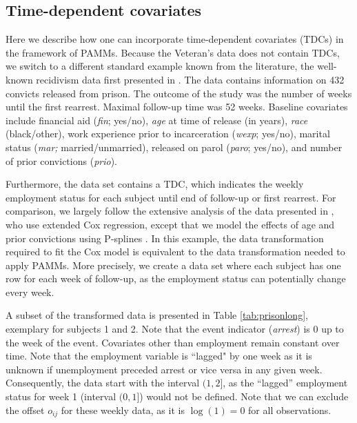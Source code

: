 \documentclass[submit]{smj}
\begin{document}
\subsection{Time-dependent covariates}\label{subsec:tdc}
Here we describe how one can incorporate time-dependent covariates (TDCs) in the framework of PAMMs.
Because the Veteran's data does not contain TDCs, we switch to a different standard example known from the literature, the well-known recidivism data first presented in \cite{Rossi1980}.
The data contains information on 432 convicts released from prison.
The outcome of the study was the number of weeks until the first rearrest.
Maximal follow-up time was 52 weeks. Baseline covariates include
financial aid ({\it fin}; yes/no), {\it age} at time of release (in years),
{\it race} (black/other), work experience prior to incarceration ({\it wexp};
yes/no), marital status ({\it mar;} married/unmarried), released on parol
({\it paro}; yes/no), and number of prior convictions ({\it prio}).

Furthermore, the data set contains a TDC, which indicates the weekly employment
status for each subject until end of follow-up or first rearrest.
For comparison, we largely follow the extensive analysis of the data presented
in \cite{Fox2011}, who use extended Cox regression, except that we model
the effects of age and prior convictions using P-splines \citep{Eilers:98}.
In this example, the data transformation required to fit the Cox model is
equivalent to the data transformation needed to apply PAMMs. More precisely, we create a data set where each subject has one row for each week of follow-up, as the employment status can potentially change every week.

A subset of the transformed data is
presented in Table \ref{tab:prisonlong}, exemplary for subjects 1 and 2.
Note that the event indicator ({\it arrest}) is 0 up to the week of the event.
Covariates other than employment remain constant over time. Note that the
employment variable is ``lagged" by one week as it is unknown if unemployment
preceded arrest or vice versa in any given week. Consequently, the data start
with the interval $(1, 2]$, as the ``lagged'' employment status for week 1
(interval $(0, 1]$) would not be defined.
Note that we can exclude the offset $o_{ij}$ for these weekly data, as
it is $\log(1)=0$ for all observations.
\end{document}
